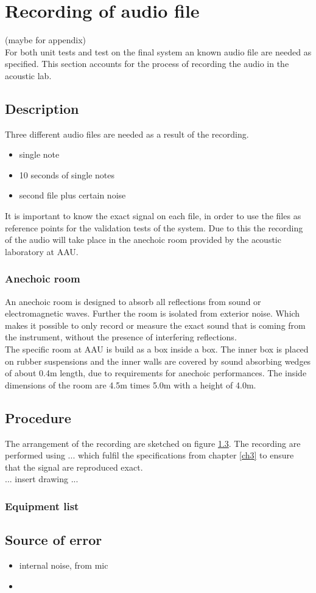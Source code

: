 \section{Recording of audio file}
(maybe for appendix)\\
For both unit tests and test on the final system an known audio file are needed as specified. This section accounts for the process of recording the audio in the acoustic lab.
\subsection{Description}
Three different audio files are needed as a result of the recording.
\begin{itemize}
\item[1.] single note  
\item[2.] 10 seconds of single notes  
\item[3.] second file plus certain noise
\end{itemize} 
It is important to know the exact signal on each file, in order to use the files as reference points for the validation tests of the system. Due to this the recording of the audio will take place in the anechoic room provided by the acoustic laboratory at AAU. \\
\subsubsection{Anechoic room}   
An anechoic room is designed to absorb all reflections from sound or electromagnetic waves. Further the room is isolated from exterior noise. Which makes it possible to only record or measure the exact sound that is coming from the instrument, without the presence of interfering reflections. \\ The specific room at AAU is build as a box inside a box. The inner box is placed on rubber suspensions and the inner walls are covered by sound absorbing wedges of about 0.4m length, due to requirements for anechoic performances. The inside dimensions of the room are 4.5m times 5.0m with a height of 4.0m.

\subsection{Procedure}
The arrangement of the recording are sketched on figure \ref{}. The recording are performed using ... which fulfil the specifications from chapter \ref{ch3} to ensure that the signal are reproduced exact.\\ 
... insert drawing ...

\subsubsection{Equipment list}

\subsection{Source of error}
\begin{itemize}
\item[-] internal noise, from mic 
\item[-]	
\end{itemize}

 


